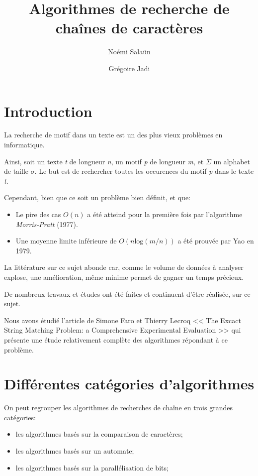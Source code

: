\documentclass[a4paper,11pt]{article}
\begin{document}
\title{Algorithmes de recherche de chaînes de caractères}
\author{Noémi Salaün \and{} Grégoire Jadi}
\date{}

\maketitle
\tableofcontents

\section{Introduction}

La recherche de motif dans un texte est un des plus vieux problèmes en informatique.

Ainsi, soit un texte \emph{t} de longueur \emph{n}, un motif \emph{p} de longueur \emph{m}, et $ \Sigma $ un alphabet de taille $ \sigma $. Le but est de rechercher toutes les occurences du motif \emph{p} dans le texte \emph{t}.

Cependant, bien que ce soit un problème bien définit, et que:

\begin{itemize}
\item Le pire des cas $ O(n) $ a été atteind pour la première fois par l'algorithme \emph{Morris-Pratt} (1977).
\item Une moyenne limite inférieure de $ O(n\text{log}(m / n)) $ a été prouvée par Yao en 1979.
\end{itemize}

La littérature sur ce sujet abonde car, comme le volume de données à analyser explose, une amélioration, même minime permet de gagner un temps précieux.

De nombreux travaux et études ont été faites et continuent d'être réalisée, sur ce sujet.

Nous avons étudié l'article de Simone Faro et Thierry Lecroq << The Excact String Matching Problem: a Comprehensive Experimental Evaluation >>\cite{DBLP:journals/corr/abs-1012-2547} qui présente une étude relativement complète des algorithmes répondant à ce problème.

\section{Différentes catégories d'algorithmes}

On peut regrouper les algorithmes de recherches de chaîne en trois grandes catégories:

\begin{itemize}
\item les algorithmes basés sur la comparaison de caractères;
\item les algorithmes basés sur un automate;
\item les algorithmes basés sur la parallélisation de bits;
\end{itemize}
\end{document}
